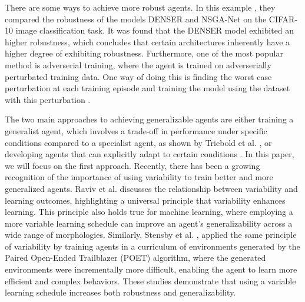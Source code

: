     There are some ways to achieve more robust agents. In this example \cite{Ines_Valentin_2022}, they compared the robustness of the models DENSER and NSGA-Net on the CIFAR-10 image classification task. It was found that the DENSER model exhibited an higher robustness, which concludes that certain architectures inherently have a higher degree of exhibiting robustness. Furthermore, one of the most popular method is adverserial training, where the agent is trained on adverserially perturbated training data. One way of doing this is finding the worst case perturbation at each training episode and training the model using the dataset with this perturbation \cite{Kai_Liang_Tan_2020}. 
    
    The two main approaches to achieving generalizable agents are either training a generalist agent, which involves a trade-off in performance under specific conditions compared to a specialist agent, as shown by Triebold et al. \cite{Corinna_Triebold}, or developing agents that can explicitly adapt to certain conditions \cite{Charles_Packer_2019}. In this paper, we will focus on the first approach. Recently, there has been a growing recognition of the importance of using variability to train better and more generalized agents. Raviv et al. \cite{Limor_Raviv_2022} discusses the relationship between variability and learning outcomes, highlighting a universal principle that variability enhances learning. This principle also holds true for machine learning, where employing a more variable learning schedule can improve an agent's generalizability across a wide range of morphologies. Similarly, Stensby et al. \cite{Emma_Stensby_2021}, applied the same principle of variability by training agents in a curriculum of environments generated by the Paired Open-Ended Trailblazer (POET) algorithm, where the generated environments were incrementally more difficult, enabling the agent to learn more efficient and complex behaviors. These studies demonstrate that using a variable learning schedule increases both robustness and generalizability.